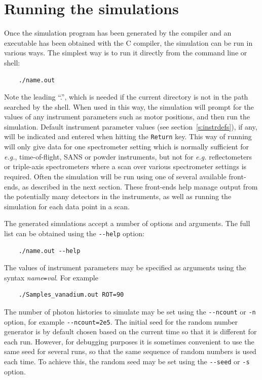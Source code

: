 \section{Running the simulations}
\label{s:run-sim}

Once the simulation program has been generated by the \MCX compiler
and an executable has been obtained with the C compiler, the simulation
can be run in various ways. The simplest way is to run it directly from the
command line or shell:
\begin{verbatim}
    ./name.out
\end{verbatim}
Note the leading ``.'', which is needed if the current directory is not in
the path searched by the shell. When used in this way, the simulation
will prompt for the values of any instrument parameters such as motor
positions, and then run the simulation. Default instrument parameter values (see section~\ref{s:instrdefs}), if any, will be indicated and entered when hitting the \verb+Return+ key.
This way of running \MCX will only give data for one spectrometer
setting which is normally sufficient for {\em e.g.}, time-of-flight,
SANS or powder instruments, but not for {\em e.g.} reflectometers or triple-axis spectrometers where a scan over
various spectrometer settings is required.
Often the simulation will be run using one of several
available front-ends, as described in the next section. These front-ends
help manage output from the potentially many detectors in the
instruments, as well as running the simulation for each data point in
a scan.

The generated simulations accept a number of options and arguments. The
full list can be obtained using the \verb+--help+ option:
\begin{verbatim}
    ./name.out --help
\end{verbatim}
The values of instrument parameters may be specified as arguments using
the syntax \textit{name}\verb+=+\textit{val}. For example
\begin{verbatim}
    ./Samples_vanadium.out ROT=90
\end{verbatim}
The number of photon histories to simulate may be set using the
\verb+--ncount+ or \verb+-n+ option, for example
\verb+--ncount=2e5+. The initial seed for the random number generator is
by default chosen based on the current time so that it is different for
each run. However, for debugging purposes it is sometimes convenient to
use the same seed for several runs, so that the same sequence of random
numbers is used each time. To achieve this, the random seed may be set
using the \verb+--seed+ or \verb+-s+ option.

